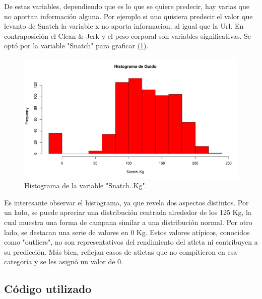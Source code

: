 De estas variables, dependiendo que es lo que se quiere predecir, hay varias que no aportan información alguna. Por ejemplo si uno quisiera predecir el valor que levanto de Snatch la variable x no aporta informacion, al igual que la Url. En contraposición el Clean $\&$ Jerk y el peso corporal son variables significativas.
Se optó por la variable "Snatch" para graficar (\ref{fig:histSnatch}).
\begin{figure}[H]
	\centering
	\includegraphics[width=\linewidth]{../Ejercicio-1/ImagenesEjercicio1/histSnatch.pdf}
	\caption{Histograma de la variable "Snatch..Kg".}	
	\label{fig:histSnatch}
\end{figure}
Es interesante observar el histograma, ya que revela dos aspectos distintos. Por un lado, se puede apreciar una distribución centrada alrededor de los 125 Kg, la cual muestra una forma de campana similar a una distribución normal. Por otro lado, se destacan una serie de valores en 0 Kg. Estos valores atípicos, conocidos como "outliers", no son representativos del rendimiento del atleta ni contribuyen a su predicción. Más bien, reflejan casos de atletas que no compitieron en esa categoría y se les asignó un valor de 0.
\subsection{Código utilizado}


%
